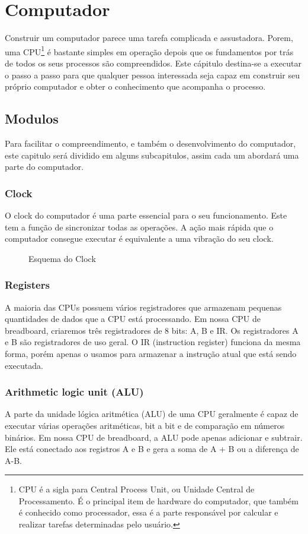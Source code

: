 \section{Computador} 
Construir um computador parece uma tarefa complicada e assustadora. Porem, uma CPU\footnote{CPU é a sigla para Central Process Unit, ou Unidade Central de Processamento. É o principal item de hardware do computador, que também é conhecido como processador, essa é a parte responsável por calcular e realizar tarefas determinadas pelo usuário.} é bastante simples em operação depois que os fundamentos por trás de todos os seus processos são compreendidos. Este cápitulo destina-se a executar o passo a passo para que qualquer pessoa interessada seja capaz em construir seu próprio computador e obter o conhecimento que acompanha o processo.

\subsection{Modulos}
Para facilitar o compreendimento, e também o desenvolvimento do computador, este capitulo será dividido em alguns subcapitulos, assim cada um abordará uma parte do computador. 

\subsubsection{Clock}
O clock do computador é uma parte essencial para o seu funcionamento. Este tem a função de sincronizar todas as operações. A ação mais rápida que o computador consegue executar é equivalente a uma vibração do seu clock.
\begin{figure}[H] \centering 
  \caption{\label{fig:1} Esquema do Clock} 
\end{figure}

\subsubsection{Registers}
A maioria das CPUs possuem vários registradores que armazenam pequenas quantidades de dados que a CPU está processando. Em nossa CPU de breadboard, criaremos três registradores de 8 bits: A, B e IR. Os registradores A e B são registradores de uso geral. O IR (instruction register) funciona da mesma forma, porém apenas o usamos para armazenar a instrução atual que está sendo executada.

\subsubsection{Arithmetic logic unit (ALU)}
A parte da unidade lógica aritmética (ALU) de uma CPU geralmente é capaz de executar várias operações aritméticas, bit a bit e de comparação em números binários. Em nossa CPU de breadboard, a ALU pode apenas adicionar e subtrair. Ele está conectado aos registros A e B e gera a soma de A + B ou a diferença de A-B.

